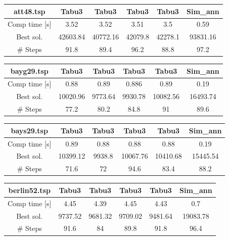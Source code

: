 \documentclass[a4paper,10pt]{article}
\begin{document}
\begin{center}
\begin{tabular}{|c|c|c|c|c|c|}
\hline 
att48.tsp & Tabu3 & Tabu3 & Tabu3 & Tabu3 & Sim\_ann \\ 
\hline 
Comp time [s] & 3.52 & 3.52 & 3.51 & 3.5 & 0.59 \\ 
\hline 
Best sol. & 42603.84 & 40772.16 & 42079.8 & 42278.1 & 93831.16 \\ 
\hline 
\# Steps & 91.8 & 89.4 & 96.2 & 88.8 & 97.2 \\ 
\hline 
\end{tabular} 
\end{center}

\begin{center}
\begin{tabular}{|c|c|c|c|c|c|}
\hline 
bayg29.tsp & Tabu3 & Tabu3 & Tabu3 & Tabu3 & Sim\_ann\\ 
\hline 
Comp time [s] & 0.88 & 0.89 & 0.886 & 0.89 & 0.19 \\ 
\hline 
Best sol. & 10020.96 & 9773.64 & 9930.78 & 10082.56 & 16493.74 \\ 
\hline 
\# Steps & 77.2 & 80.2 & 84.8 & 91 & 89.6 \\ 
\hline 
\end{tabular} 
\end{center}

\begin{center}
\begin{tabular}{|c|c|c|c|c|c|}
\hline 
bays29.tsp & Tabu3 & Tabu3 & Tabu3 & Tabu3 & Sim\_ann\\ 
\hline 
Comp time [s] & 0.89 & 0.88 & 0.88 & 0.88 & 0.19 \\ 
\hline 
Best sol. & 10399.12 & 9938.8 & 10067.76 & 10410.68 & 15445.54 \\ 
\hline 
\# Steps & 71.6 & 72 & 94.6 & 83.4 & 88.2 \\ 
\hline 
\end{tabular} 
\end{center}

\begin{center}
\begin{tabular}{|c|c|c|c|c|c|}
\hline 
berlin52.tsp & Tabu3 & Tabu3 & Tabu3 & Tabu3 & Sim\_ann\\ 
\hline 
Comp time [s] & 4.45 & 4.39 & 4.45 & 4.43 & 0.7 \\ 
\hline 
Best sol. & 9737.52 & 9681.32 & 9709.02 & 9481.64 & 19083.78 \\ 
\hline 
\# Steps & 91.6 & 84 & 89.8 & 91.8 & 96.4\\ 
\hline 
\end{tabular} 
\end{center}
\end{document}
